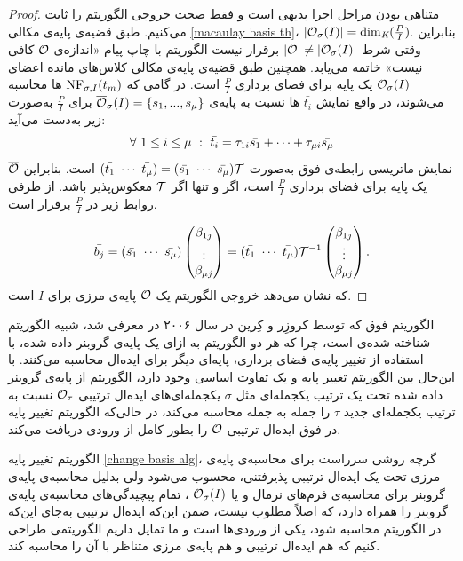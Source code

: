 \begin{proof}
متناهی بودن مراحل اجرا بدیهی است و فقط صحت خروجی الگوریتم را ثابت می‌کنیم. طبق قضیه‌ی پایه‌ی مکالی 
\ref{macaulay basis th}،
$|{\mathcal O}_{\sigma}(I)| = \dim_{\textit{K}}(\frac{P}{I})$.
بنابراین وقتی شرط 
$|{\mathcal O}|\neq|{\mathcal O}_{\sigma}(I)|$
برقرار نیست الگوریتم با چاپ پیام «اندازه‌ی 
${\mathcal O}$
کافی نیست» خاتمه می‌یابد. همچنین طبق قضیه‌ی پایه‌ی مکالی کلاس‌های مانده اعضای 
${\mathcal O}_{\sigma}(I)$
یک پایه برای فضای برداری 
$\frac{P}{I}$
است. در گامی که 
$\operatorname{\mathrm{NF}}_{\sigma,I}(t_{m})$
ها محاسبه می‌شوند، در واقع نمایش 
$\bar{t_{i}}$
ها نسبت به پایه‌ی 
$\overline{{\mathcal O}}_{\sigma}(I) = \{\bar{s_{1}},...,\bar{s_{\mu}}\}$
برای 
$\frac{P}{I}$
به‌صورت زیر به‌دست  می‌آید:
$$\forall \ 1\leq i\leq \mu \ : \ \bar{t_{i}} = \tau_{1i}\bar{s_{1}} +\cdots+ \tau_{\mu i}\bar{s_{\mu}}$$
نمایش ماتریسی رابطه‌ی فوق به‌صورت 
$(\bar{t_{1}} \ \cdots \ \bar{t_{\mu}}) = (\bar{s_{1}} \ \cdots \ \bar{s_{\mu}}){\mathcal T}$
است. بنابراین 
$\overline{{\mathcal O}}$
یک پایه‌ برای فضای برداری 
$\frac{P}{I}$
است، اگر و تنها اگر 
${\mathcal T}$
معکوس‌پذیر باشد. از طرفی روابط زیر در $\frac{P}{I}$ برقرار است.

$$\bar{b_{j}} = (\bar{s_{1}} \ \cdots \ \bar{s_{\mu}})
\begin{pmatrix}
\beta_{1j}\\
\vdots\\
\beta_{\mu j}\\
\end{pmatrix}  = (\bar{t_{1}} \ \cdots \ \bar{t_{\mu}})\mT^{-1}\begin{pmatrix}
\beta_{1j}\\
\vdots\\
\beta_{\mu j}\\
\end{pmatrix}.$$
که نشان می‌دهد خروجی الگوریتم یک 
${\mathcal O}$
پایه‌ی مرزی برای 
$I$
است.
\end{proof}
الگوریتم فوق که توسط کروزِر و کِرین در سال ۲۰۰۶ در 
\cite{kehrein2006computing}
معرفی شد، شبیه الگوریتم شناخته‌ شده‌ی 
\cite{faugere1993efficient}
است، چرا که هر دو الگوریتم به ازای یک پایه‌ی گروبنر داده شده، با استفاده از تغییر پایه‌ی فضای برداری، پایه‌ای دیگر برای ایده‌ال محاسبه می‌کنند. با این‌حال بین الگوریتم تغییر پایه‌ و 
یک تفاوت اساسی وجود دارد، الگوریتم 
از پایه‌ی گروبنر داده شده تحت یک ترتیب یکجمله‌ای مثل 
$\sigma$
یکجمله‌ای‌های ایده‌ال ترتیبی 
${\mathcal O}_{\tau}$
نسبت به ترتیب یکجمله‌ای جدید 
$\tau$
را جمله به جمله محاسبه می‌کند، در حالی‌که الگوریتم تغییر پایه در فوق ایده‌ال ترتیبی 
${\mathcal O}$
را بطور کامل از ورودی دریافت می‌کند. 

الگوریتم تغییر پایه 
\ref{change basis alg}،
گرچه روشی سرراست برای محاسبه‌ی پایه‌ی مرزی تحت یک ایده‌ال ترتیبی پذیرفتنی، محسوب می‌شود ولی بدلیل محاسبه‌ی پایه‌ی گروبنر برای محاسبه‌ی فرم‌های نرمال و یا 
${\mathcal O}_{\sigma}(I)$
، تمام پیچیدگی‌های محاسبه‌ی پایه‌ی گروبنر را همراه دارد، که اصلاً مطلوب نیست، ضمن این‌که ایده‌ال ترتیبی به‌جای این‌که در الگوریتم محاسبه شود، یکی از ورودی‌ها است و ما تمایل داریم الگوریتمی طراحی کنیم که هم ایده‌ال ترتیبی و هم پایه‌ی مرزی متناظر با آن را محاسبه کند.

